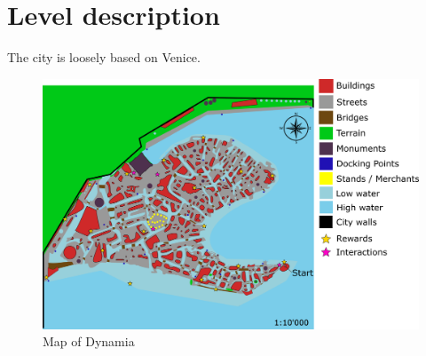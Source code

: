 \section{Level description}

The city is loosely based on Venice.

\begin{center}
  \begin{figure}[H]
    \centering
    \includegraphics[width=\textwidth]{Images/Maps/dynamia}
    \caption{Map of Dynamia}
  \end{figure}
\end{center}

\newpage

